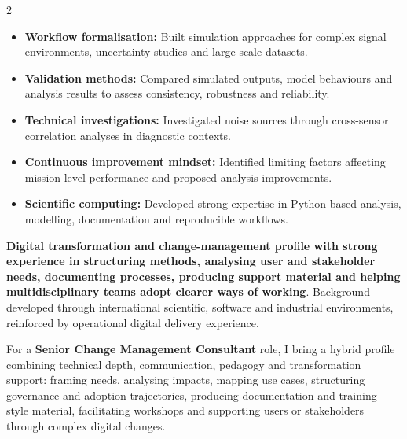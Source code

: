 \documentclass[8pt,a4paper,ragged2e,withhyper]{altacv}
\begin{document}
\begin{paracol}{2}
\begin{itemize}
  \item \textbf{Workflow formalisation:} Built simulation approaches for complex signal environments, uncertainty studies and large-scale datasets.
  \item \textbf{Validation methods:} Compared simulated outputs, model behaviours and analysis results to assess consistency, robustness and reliability.
  \item \textbf{Technical investigations:} Investigated noise sources through cross-sensor correlation analyses in diagnostic contexts.
  \item \textbf{Continuous improvement mindset:} Identified limiting factors affecting mission-level performance and proposed analysis improvements.
  \item \textbf{Scientific computing:} Developed strong expertise in Python-based analysis, modelling, documentation and reproducible workflows.
\end{itemize}

\switchcolumn



\textbf{Digital transformation and change-management profile with strong experience in structuring methods, analysing user and stakeholder needs, documenting processes, producing support material and helping multidisciplinary teams adopt clearer ways of working}. Background developed through international scientific, software and industrial environments, reinforced by operational digital delivery experience.

For a \textbf{Senior Change Management Consultant} role, I bring a hybrid profile combining technical depth, communication, pedagogy and transformation support: framing needs, analysing impacts, mapping use cases, structuring governance and adoption trajectories, producing documentation and training-style material, facilitating workshops and supporting users or stakeholders through complex digital changes.


\end{paracol}
\end{document}
